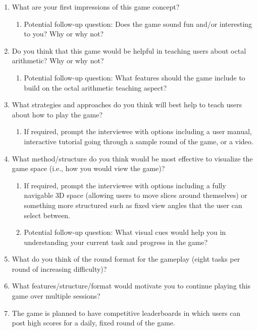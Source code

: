 \documentclass{article}
\begin{document}
\begin{enumerate}
    \item What are your first impressions of this game concept?
    \begin{enumerate}
        \item Potential follow-up question: Does the game sound fun and/or interesting to you? Why or why not?
    \end{enumerate}
    \item Do you think that this game would be helpful in teaching users about octal arithmetic? Why or why not?
    \begin{enumerate}
        \item Potential follow-up question: What features should the game include to build on the octal arithmetic teaching aspect?
    \end{enumerate}
    \item What strategies and approaches do you think will best help to teach users about how to play the game?
    \begin{enumerate}
        \item If required, prompt the interviewee with options including a user manual, interactive tutorial going through a sample round of the game, or a video.
    \end{enumerate}
    \item What method/structure do you think would be most effective to visualize the game space (i.e., how you would view the game)?
    \begin{enumerate}
        \item If required, prompt the interviewee with options including a fully navigable 3D space (allowing users to move slices around themselves) or something more structured such as fixed view angles that the user can select between.
        \item Potential follow-up question: What visual cues would help you in understanding your current task and progress in the game?
    \end{enumerate}
    \item What do you think of the round format for the gameplay (eight tasks per round of increasing difficulty)?
    \item What features/structure/format would motivate you to continue playing this game over multiple sessions?
    \item The game is planned to have competitive leaderboards in which users can post high scores for a daily, fixed round of the game.
    \begin{enumerate}

\end{enumerate}
\end{enumerate}
\end{document}
